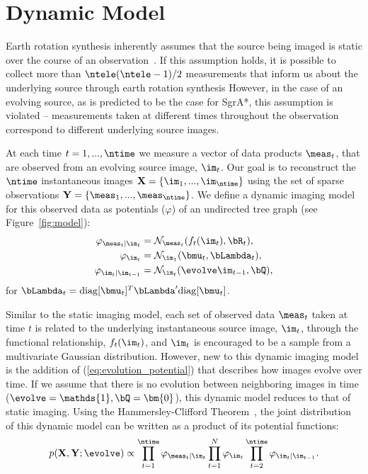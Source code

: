 \section{Dynamic Model}
\label{sec:dynamic_model}

Earth rotation synthesis inherently assumes that the source being imaged is static over the course of an observation~\cite{taylor1999synthesis}. 
If this assumption holds, it is possible to collect more than $\ntele (\ntele-1)/2$ measurements that inform us about the underlying source through earth rotation synthesis
However, in the case of an evolving source, as is predicted to be the case for SgrA*, this assumption is violated -- measurements taken at different times throughout the observation correspond to different underlying source images. 

At each time $t=1,...,\ntime$ we measure a vector of data products $\meas_t$, that are observed
from an evolving source image, $\im_t$. Our goal is to reconstruct the $\ntime$ instantaneous images $ {\bf X} = \{\im_1, ..., \im_\ntime \}$ using the set of sparse observations $ {\bf Y} = \{\meas_1, ..., \meas_\ntime \}$. We define a dynamic imaging %
model for this observed data as potentials ($\varphi$) of an undirected tree graph (see Figure~\ref{fig:model}):
\begin{align}
\varphi_{\meas_t | \im_t} &=  \mathcal{N}_{\meas_t} ( f_t ( \im_{t} ) , \bR_t ), \\
\varphi_{\im_t} &=  \mathcal{N}_{\im_1} ( \bmu_t, \bLambda_t ), \\
\varphi_{\im_t|\im_{t-1}} &=  \mathcal{N}_{\im_t} ( \evolve \im_{t-1}, \bQ ), 
\label{eq:evolution_potential}
\end{align}
for $\bLambda_t = \mathrm{diag}[\bmu_t]^T \bLambda'\mathrm{diag}[\bmu_t]$. 


Similar to the static imaging model, each set of observed data $\meas_t$ taken at time $t$ is related to the underlying instantaneous source image, $\im_t$, through the functional relationship, $f_t(\im_t)$, and $\im_t$ is encouraged to be a sample from a multivariate Gaussian distribution. However, new to this dynamic imaging model is the addition of (\ref{eq:evolution_potential}) that describes how images evolve over time. 
If we assume that there is no evolution between neighboring images in time ($\evolve=\mathds{1}, \bQ = \bm{0}$), this dynamic model reduces to that of static imaging. 
Using the Hammersley-Clifford Theorem~\cite{hammersley1971markov}, the joint distribution of this dynamic model can be written as a product of its potential functions: 
\begin{align}
p({\bf X}, {\bf Y} ; \evolve )  \propto \prod_{t=1}^{\ntime} \varphi_{\meas_t |\im_t} \prod_{t=1}^{N} \varphi_{\im_t}   \prod_{t=2}^{\ntime} \varphi_{\im_t|\im_{t-1}} .
\label{eq:likelihood}
\end{align}

